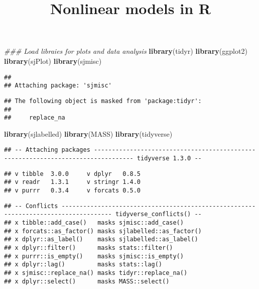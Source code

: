 \documentclass[
]{article}
\title{Nonlinear models in R}
\author{}
\date{\vspace{-2.5em}}
\newenvironment{Shaded}{\begin{snugshade}}{\end{snugshade}}
\newcommand{\CommentTok}[1]{\textcolor[rgb]{0.56,0.35,0.01}{\textit{#1}}}
\newcommand{\KeywordTok}[1]{\textcolor[rgb]{0.13,0.29,0.53}{\textbf{#1}}}
\newcommand{\NormalTok}[1]{#1}
\begin{document}
\maketitle

\begin{Shaded}
\begin{Highlighting}[]
\CommentTok{### Load libraies for plots and data analysis}
\KeywordTok{library}\NormalTok{(tidyr)}
\KeywordTok{library}\NormalTok{(ggplot2)}
\KeywordTok{library}\NormalTok{(sjPlot)}
\KeywordTok{library}\NormalTok{(sjmisc)}
\end{Highlighting}
\end{Shaded}

\begin{verbatim}
## 
## Attaching package: 'sjmisc'
\end{verbatim}

\begin{verbatim}
## The following object is masked from 'package:tidyr':
## 
##     replace_na
\end{verbatim}

\begin{Shaded}
\begin{Highlighting}[]
\KeywordTok{library}\NormalTok{(sjlabelled)}
\KeywordTok{library}\NormalTok{(MASS)}
\KeywordTok{library}\NormalTok{(tidyverse)}
\end{Highlighting}
\end{Shaded}

\begin{verbatim}
## -- Attaching packages --------------------------------------------------------------------------------- tidyverse 1.3.0 --
\end{verbatim}

\begin{verbatim}
## v tibble  3.0.0     v dplyr   0.8.5
## v readr   1.3.1     v stringr 1.4.0
## v purrr   0.3.4     v forcats 0.5.0
\end{verbatim}

\begin{verbatim}
## -- Conflicts ------------------------------------------------------------------------------------ tidyverse_conflicts() --
## x tibble::add_case()   masks sjmisc::add_case()
## x forcats::as_factor() masks sjlabelled::as_factor()
## x dplyr::as_label()    masks sjlabelled::as_label()
## x dplyr::filter()      masks stats::filter()
## x purrr::is_empty()    masks sjmisc::is_empty()
## x dplyr::lag()         masks stats::lag()
## x sjmisc::replace_na() masks tidyr::replace_na()
## x dplyr::select()      masks MASS::select()
\end{verbatim}
\end{document}
